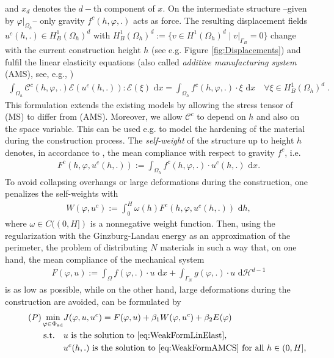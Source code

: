 \documentclass[a4paper,11pt]{article}
\theoremstyle{remark}
\newcommand{\dx}{\text{ d}x}
\renewcommand{\dh}{\text{ d}h}
\newcommand{\dH}{\text{ d}\mathcal{H}^{d-1}}
\newcommand{\intO}{\int_{\Omega}}
\newcommand{\intG}{\int_{\Gamma_{N}}}
\newcommand{\Pad}{\Phi_{\text{ad}}}
\begin{document}
and $x_d$ denotes the $d-$th component of $x$. 
On the intermediate structure --given by $\varphi|_{\Omega_h}$-- only gravity $f^c(h, \varphi, .)$ acts as force.
The resulting displacement fields
$u^c(h,.)\in H^1_B(\Omega_{h})^d$ with $H^1_B(\Omega_{h})^d:= \{v \in H^1(\Omega_h)^d \mid v|_{\Gamma_B}=0 \}$ change
with the current construction height $h$
(see e.g. Figure \ref{fig:Displacements})
and
fulfil the linear elasticity equations (also called {\em additive manufacturing system} (AMS), see, e.g., \cite{AllaireOverview2,WIAS}) 
\begin{align}
\label{eq:WeakFormAMCS}
\int_{\Omega_{h}}\mathcal{C}^c(h,\varphi,.)
\mathcal{E}(u^c(h,.)):\mathcal{E}(\xi) \dx
= \int_{\Omega_{h}}f^c(h,\varphi,.) \cdot \xi \dx 
\quad \forall \xi\in H^1_B(\Omega_{h})^d \; . \tag{AMS}
\end{align}
This formulation extends the existing models by allowing the stress tensor of (MS) to differ from (AMS). Moreover, we allow $\mathcal{C}^c$ to depend on $h$ and also on the space variable. This can be used e.g. to model the hardening of the material during the construction process.
The {\em self-weight} of the structure up to height $h$ denotes, in accordance to \cite{AllaireOverview2}, the mean compliance with respect to gravity $f^c$, i.e.
\begin{align}
\label{selfweight}
F^c(h,\varphi, u^c(h,.)) :=
\int_{\Omega_h} f^c(h,\varphi,.) \cdot u^c(h,.) \dx.
\end{align}
To avoid collapsing overhangs or large deformations during the construction, one penalizes the self-weights with
\begin{align}
\label{eq:LayerComp1}
W(\varphi, u^c) :=
\int_0^H
\omega(h) 
F^c(h,\varphi, u^c(h,.)) 
\dh,
\end{align}
where $\omega \in C((0,H])$ is a nonnegative weight function.
%
Then, using the regularization with the Ginzburg-Landau energy as an approximation of the perimeter, the problem of distributing $N$ materials in such a way that, on one hand, the mean compliance of the mechanical system
\begin{align}
\label{eq:MeanComp}
F(\varphi, u):=\intO f(\varphi,.) \cdot u \dx + \intG g(\varphi,. ) \cdot u\dH
\end{align}
is as low as possible, while on the other hand, large deformations during the construction are avoided, can be formulated by
\begin{align}
\tag{$P$}
\label{eq:ContCostFunc}
\min_{\varphi \in \Pad} & J(\varphi, u, u^c) =
F(\varphi, u) 
+ \beta_{1}  W(\varphi,u^c)
+ \beta_{2}E(\varphi) \\ 
\text{s.t.} \quad
& u \text{ is the solution to } \eqref{eq:WeakFormLinElast} \text{, } \nonumber  \\
& u^c(h,.) \text{ is the solution to }
\eqref{eq:WeakFormAMCS}
\text{ for all } h \in (0,H] , \nonumber
\end{align}
\end{document}
